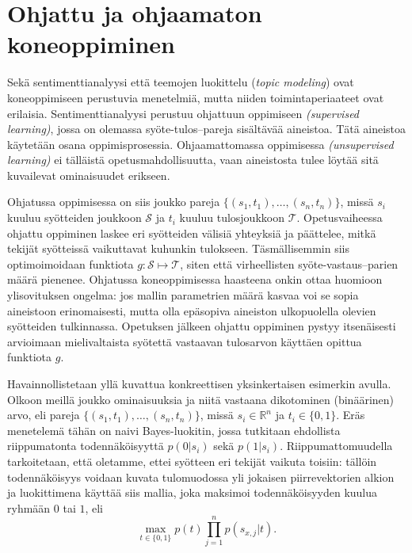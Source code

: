 \documentclass[finnish,gradu,twoside,12pt]{tktltiki}
\begin{document}
{%

\section{Ohjattu ja ohjaamaton koneoppiminen}

Sekä sentimenttianalyysi että teemojen luokittelu (\textit{topic modeling}) ovat koneoppimiseen perustuvia menetelmiä, mutta niiden toimintaperiaateet ovat erilaisia. Sentimenttianalyysi perustuu ohjattuun oppimiseen \textit{(supervised learning)}, jossa on olemassa syöte-tulos--pareja sisältävää aineistoa. Tätä aineistoa käytetään osana oppimisprosessia. Ohjaamattomassa oppimisessa \textit{(unsupervised learning)} ei tälläistä opetusmahdollisuutta, vaan aineistosta tulee löytää sitä kuvailevat ominaisuudet erikseen.

Ohjatussa oppimisessa on siis joukko pareja $\{ (s_1, t_1), \ldots , (s_n, t_n) \}$, missä $s_i$ kuuluu syötteiden joukkoon $\mathcal{S}$ ja $t_i$ kuuluu tulosjoukkoon  $\mathcal{T}$. Opetusvaiheessa ohjattu oppiminen laskee eri syötteiden välisiä yhteyksiä ja päättelee, mitkä tekijät syötteissä vaikuttavat kuhunkin tulokseen. Täsmällisemmin siis optimoimoidaan funktiota $g: \mathcal{S} \mapsto \mathcal{T}$, siten että virheellisten syöte-vastaus--parien määrä pienenee. Ohjatussa koneoppimisessa haasteena onkin ottaa huomioon ylisovituksen ongelma: jos mallin parametrien määrä kasvaa voi se sopia aineistoon erinomaisesti, mutta olla epäsopiva aineiston ulkopuolella olevien syötteiden tulkinnassa. Opetuksen jälkeen ohjattu oppiminen pystyy itsenäisesti arvioimaan mielivaltaista syötettä vastaavan tulosarvon käyttäen opittua funktiota $g$.

Havainnollistetaan yllä kuvattua konkreettisen yksinkertaisen esimerkin avulla. Olkoon meillä joukko ominaisuuksia ja niitä vastaana dikotominen (binäärinen) arvo, eli pareja $\{ (s_1, t_1), \ldots , (s_n, t_n) \}$, missä $s_i \in \mathbb{R}^n$ ja $t_i \in \{0,1\}$. Eräs menetelemä tähän on naivi Bayes-luokitin, jossa tutkitaan ehdollista riippumatonta todennäköisyyttä $p( 0 | s_i )$ sekä $p( 1 | s_i )$. Riippumattomuudella tarkoitetaan, että oletamme, ettei syötteen eri tekijät vaikuta toisiin: tällöin todennäköisyys voidaan kuvata tulomuodossa yli jokaisen piirrevektorien alkion ja luokittimena käyttää siis mallia, joka maksimoi todennäköisyyden kuulua ryhmään $0$ tai $1$, eli  $$\max_{t \in \{0,1\}} p(t) \prod_{j=1}^n p( s_{x,j} | t).$$

}
\end{document}
